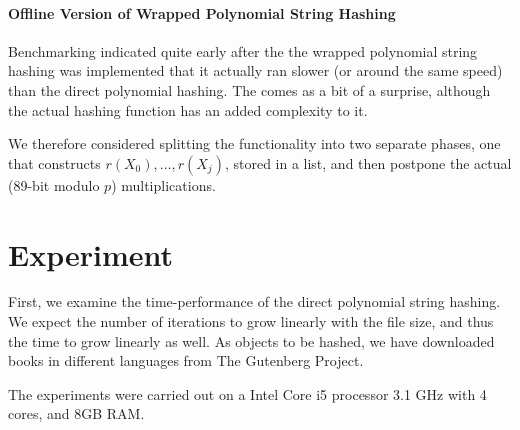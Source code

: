 \documentclass[]{article}
\begin{document}





\paragraph{Offline Version of Wrapped Polynomial String Hashing}

Benchmarking indicated quite early after the the wrapped polynomial string hashing was implemented that it actually ran slower (or around the same speed) than the direct polynomial hashing. The comes as a bit of a surprise, although the actual hashing function has an added complexity to it.

We therefore considered splitting the functionality into two separate phases, one that constructs $r(X_0),\dots,r(X_j)$, stored in a list, and then postpone the actual (89-bit modulo $p$) multiplications.


\section{Experiment}
First, we examine the time-performance of the direct polynomial string hashing. We expect the number of iterations to grow linearly with the file size, and thus the time to grow linearly as well.
As objects to be hashed, we have downloaded books in different languages from The Gutenberg Project.

The experiments were carried out on a Intel Core i5 processor 3.1 GHz with 4 cores, and 8GB RAM.
\end{document}
